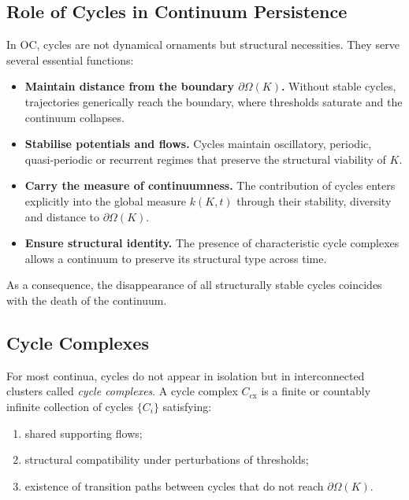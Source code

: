 \subsection{Role of Cycles in Continuum Persistence}

In OC, cycles are not dynamical ornaments but structural necessities.
They serve several essential functions:

\begin{itemize}
  \item \textbf{Maintain distance from the boundary \(\partial\Omega(K)\).}
        Without stable cycles, trajectories generically reach the boundary,
        where thresholds saturate and the continuum collapses.
  \item \textbf{Stabilise potentials and flows.}
        Cycles maintain oscillatory, periodic, quasi-periodic or recurrent
        regimes that preserve the structural viability of \(K\).
  \item \textbf{Carry the measure of continuumness.}
        The contribution of cycles enters explicitly into the global measure
        \(k(K,t)\) through their stability, diversity and distance to
        \(\partial\Omega(K)\).
  \item \textbf{Ensure structural identity.}
        The presence of characteristic cycle complexes allows a continuum
        to preserve its structural type across time.
\end{itemize}

As a consequence, the disappearance of all structurally stable cycles
coincides with the death of the continuum.

\subsection{Cycle Complexes}

For most continua, cycles do not appear in isolation but in interconnected
clusters called \emph{cycle complexes}.
A cycle complex \(C_{\mathrm{cx}}\) is a finite or countably infinite
collection of cycles \(\{C_i\}\) satisfying:

\begin{enumerate}
  \item shared supporting flows;
  \item structural compatibility under perturbations of thresholds;
  \item existence of transition paths between cycles that do not reach
        \(\partial\Omega(K)\).
\end{enumerate}

